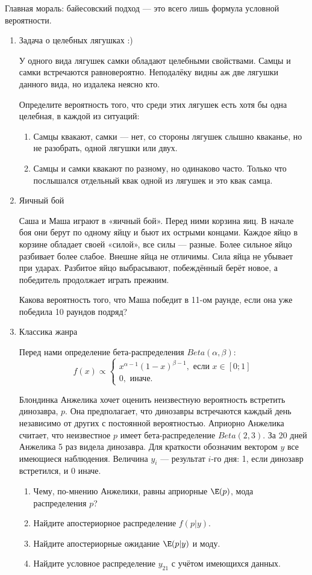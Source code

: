 Главная мораль: байесовский подход — это всего лишь формула условной вероятности.


\begin{enumerate}

\item Задача о целебных лягушках :)

У одного вида лягушек самки обладают целебными свойствами. Самцы и самки встречаются равновероятно. Неподалёку видны аж две лягушки данного вида, но издалека неясно кто.

Определите вероятность того, что среди этих лягушек есть хотя бы одна целебная, в каждой из ситуаций:
\begin{enumerate}
  \item Самцы квакают, самки — нет, со стороны лягушек слышно кваканье, но не разобрать, одной лягушки или двух.
  \item Самцы и самки квакают по разному, но одинаково часто. Только что послышался отдельный квак одной из лягушек и это квак самца.
\end{enumerate}

\item Яичный бой

Саша и Маша играют в «яичный бой». Перед ними корзина яиц. В начале боя они берут по одному яйцу и бьют их острыми концами. Каждое яйцо в корзине обладает своей «силой», все силы — разные. Более сильное яйцо разбивает более слабое. Внешне яйца не отличимы. Сила яйца не убывает при ударах. Разбитое яйцо выбрасывают, побеждённый берёт новое, а победитель продолжает играть прежним.

Какова вероятность того, что Маша победит в 11-ом раунде, если она уже победила 10 раундов подряд?

\item Классика жанра

Перед нами определение бета-распределения $Beta(\alpha, \beta)$:
\[
f(x) \propto \begin{cases}
x^{\alpha-1}(1-x)^{\beta-1}, \text{ если } x\in[0;1] \\
0, \text{ иначе.}
\end{cases}
\]

Блондинка Анжелика хочет оценить неизвестную вероятность встретить динозавра, $p$. Она предполагает, что динозавры встречаются каждый день независимо от других с постоянной вероятностью. Априорно Анжелика считает, что неизвестное $p$ имеет бета-распределение $Beta(2, 3)$. За 20 дней Анжелика 5 раз видела динозавра. Для краткости обозначим вектором $y$ все имеющиеся наблюдения. Величина $y_i$ — результат $i$-го дня: 1, если динозавр встретился, и 0 иначе.
\begin{enumerate}
\item Чему, по-мнению Анжелики, равны априорные $\E(p)$, мода распределения $p$?
\item Найдите апостериорное распределение $f(p|y)$.
\item Найдите апостериорные ожидание $\E(p|y)$ и моду.
\item Найдите условное распределение $y_{21}$ с учётом имеющихся данных.
\end{enumerate}


\end{enumerate}
